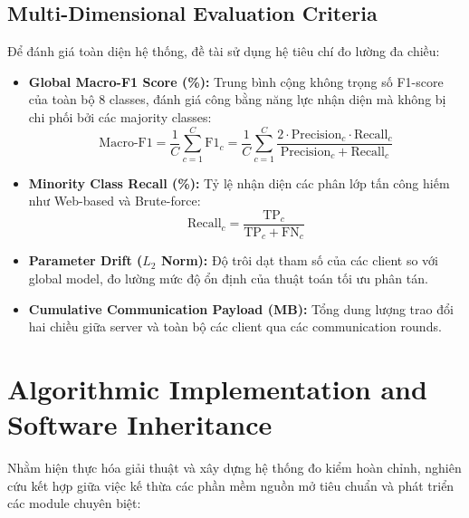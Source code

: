 \subsection{Multi-Dimensional Evaluation Criteria}
Để đánh giá toàn diện hệ thống, đề tài sử dụng hệ tiêu chí đo lường đa chiều:
\begin{itemize}
    \item \textbf{Global Macro-F1 Score (\%):} Trung bình cộng không trọng số F1-score của toàn bộ 8 classes, đánh giá công bằng năng lực nhận diện mà không bị chi phối bởi các majority classes:
    \begin{equation}
        \text{Macro-F1} = \frac{1}{C} \sum_{c=1}^C \text{F1}_c = \frac{1}{C} \sum_{c=1}^C \frac{2 \cdot \text{Precision}_c \cdot \text{Recall}_c}{\text{Precision}_c + \text{Recall}_c}
    \end{equation}
    \item \textbf{Minority Class Recall (\%):} Tỷ lệ nhận diện các phân lớp tấn công hiếm như Web-based và Brute-force:
    \begin{equation}
        \text{Recall}_c = \frac{\text{TP}_c}{\text{TP}_c + \text{FN}_c}
    \end{equation}
    \item \textbf{Parameter Drift ($L_2$ Norm):} Độ trôi dạt tham số của các client so với global model, đo lường mức độ ổn định của thuật toán tối ưu phân tán.
    \item \textbf{Cumulative Communication Payload (MB):} Tổng dung lượng trao đổi hai chiều giữa server và toàn bộ các client qua các communication rounds.
\end{itemize}

\section{Algorithmic Implementation and Software Inheritance}
\label{sec:meth_impl_inheritance}
Nhằm hiện thực hóa giải thuật và xây dựng hệ thống đo kiểm hoàn chỉnh, nghiên cứu kết hợp giữa việc kế thừa các phần mềm nguồn mở tiêu chuẩn và phát triển các module chuyên biệt:

